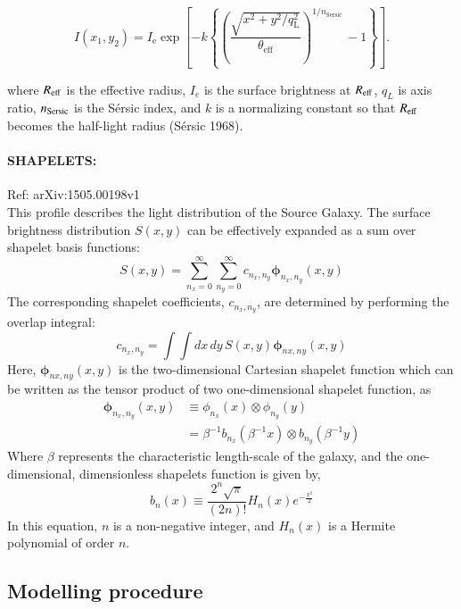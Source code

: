 \documentclass{aa}
\begin{document}
$$
I\left(x_1, y_2\right)=I_{\mathrm{e}} \exp \left[-k\left\{\left(\frac{\sqrt{x^2+y^2 / q_{\mathrm{L}}^2}}{\theta_{\mathrm{eff}}}\right)^{1 / n_{\text {Sersic }}}-1\right\}\right] .
$$

where $R_{\rm eff}$ is the effective radius, $I_e$ is the surface brightness at $R_{\rm eff}$, $q_L$ is axis ratio, $n_{\rm Sersic}$ is the Sérsic index, and $k$ is a normalizing constant so that $R_{\rm eff}$ becomes the half-light radius (Sérsic 1968).
\\
\paragraph{\textbf{SHAPELETS:}} Ref: arXiv:1505.00198v1
\\
This profile describes the light distribution of the Source Galaxy. The surface brightness distribution \( S(x, y) \) can be effectively expanded as a sum over shapelet basis functions:
\begin{equation}
    S(x, y) = \sum_{n_x=0}^{\infty} \sum_{n_y=0}^{\infty} c_{n_x,n_y} \bm{\phi}_{n_x,n_y}(x, y)
\end{equation}
The corresponding shapelet coefficients, \( c_{n_x,n_y} \), are determined by performing the overlap integral:
\begin{equation}
    c_{n_x,n_y} = \int \int dx \, dy \, S(x, y) \bm{\phi}_{nx,ny}(x, y)
\end{equation}
Here, \(\bm{\phi}_{nx,ny}(x, y)\) is the two-dimensional Cartesian shapelet function which can be written as the tensor product of two one-dimensional shapelet function, as
\begin{equation}
\begin{aligned}
    \bm{\phi}_{n_x,n_y}(x, y) & \equiv \phi_{n_x}(x) \otimes \phi_{n_y}(y) \\
    &= \beta^{-1} b_{n_x}(\beta^{-1}x) \otimes b_{n_y}(\beta^{-1}y)
\end{aligned}
\end{equation}
Where \( \beta \) represents the characteristic length-scale of the galaxy, and the one-dimensional, dimensionless shapelets function is given by,
\begin{equation}
    b_n(x) \equiv \frac{2^n \sqrt{\pi}}{(2n)!} H_n(x) e^{-\frac{x^2}{2}}
\end{equation}
In this equation, \( n \) is a non-negative integer, and \( H_n(x) \) is a Hermite polynomial of order \( n \).

\subsection{Modelling procedure}
\end{document}
